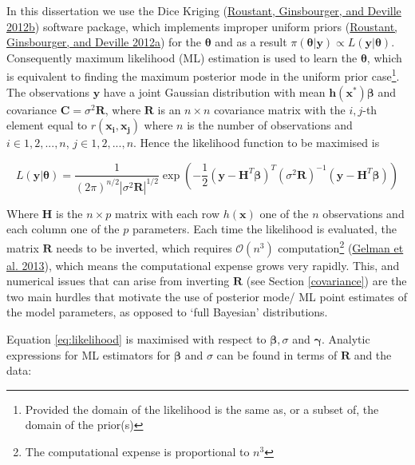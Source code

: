 \documentclass[
  12pt,
  a4paper,
  twoside]{book}
\begin{document}
In this dissertation we use the Dice Kriging (\protect\hyperlink{ref-dice_r}{Roustant, Ginsbourger, and Deville 2012b}) software package, which implements improper uniform priors (\protect\hyperlink{ref-dicekriging}{Roustant, Ginsbourger, and Deville 2012a}) for the \(\mathbf{\theta}\) and as a result \(\pi(\mathbf{\theta}|\mathbf{y}) \propto L(\mathbf{y}| \mathbf{\theta})\). Consequently maximum likelihood (ML) estimation is used to learn the \(\mathbf{\theta}\), which is equivalent to finding the maximum posterior mode in the uniform prior case\footnote{Provided the domain of the likelihood is the same as, or a subset of, the domain of the prior(s)}. The observations \(\mathbf{y}\) have a joint Gaussian distribution with mean \(\mathbf{h(\mathbf{x^*})\mathbf{\beta}}\) and covariance \(\mathbf{C} = \sigma^2 \mathbf{R}\), where \(\mathbf{R}\) is an \(n \times n\) covariance matrix with the \(i,j\)-th element equal to \(r(\mathbf{x_i}, \mathbf{x_j})\) where \(n\) is the number of observations and \(i \in 1,2,...,n\), \(j \in 1,2,...,n\). Hence the likelihood function to be maximised is

\begin{equation}
\label{eq:likelihood}
L(\mathbf{y}| \mathbf{\theta}) = \frac{1}{(2\pi)^{n/2} |\sigma^2 \mathbf{R}|^{1/2}} \exp \left( - \frac{1}{2} \left( \mathbf{y} - \mathbf{H}^T\mathbf{\beta}\right)^T \left(\sigma^2 \mathbf{R} \right)^{-1} \left( \mathbf{y} - \mathbf{H}^T\mathbf{\beta}\right) \right)
\end{equation}

Where \(\mathbf{H}\) is the \(n \times p\) matrix with each row \(h(\mathbf{\mathbf{x}})\) one of the \(n\) observations and each column one of the \(p\) parameters. Each time the likelihood is evaluated, the matrix \(\mathbf{R}\) needs to be inverted, which requires \(\mathcal{O}(n^3)\) computation\footnote{The computational expense is proportional to \(n^3\)} (\protect\hyperlink{ref-gelman2013bayesian}{Gelman et al. 2013}), which means the computational expense grows very rapidly. This, and numerical issues that can arise from inverting \(\mathbf{R}\) (see Section \ref{covariance}) are the two main hurdles that motivate the use of posterior mode/ ML point estimates of the model parameters, as opposed to `full Bayesian' distributions.

Equation \eqref{eq:likelihood} is maximised with respect to \(\mathbf{\beta}, \sigma\) and \(\mathbf{\gamma}\). Analytic expressions for ML estimators for \(\mathbf{\beta}\) and \(\sigma\) can be found in terms of \(\mathbf{R}\) and the data:
\end{document}

